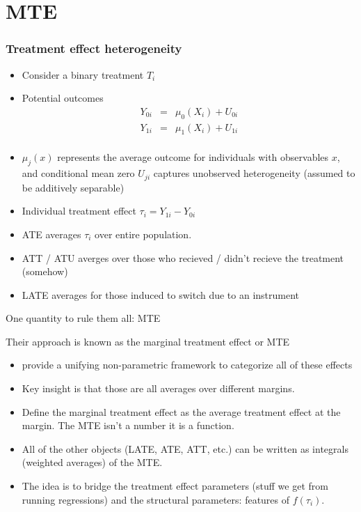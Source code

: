 \section{MTE}

\begin{frame}
  \frametitle{Treatment effect heterogeneity}
  \begin{itemize}
    \item Consider a binary treatment $T_i$
    \item Potential outcomes
      \begin{eqnarray*}
      Y_{0i} &=& \mu_{0}(X_i) + U_{0i} \\
      Y_{1i} &=& \mu_{1}(X_i) + U_{1i}\\
      \end{eqnarray*}
    \item $\mu_j(x)$ represents the average outcome for individuals with observables $x$, and conditional mean zero $U_{ji}$ captures unobserved heterogeneity (assumed to be additively separable)
    \item Individual treatment effect $\tau_i = Y_{1i} - Y_{0i}$ 
    \item ATE averages $\tau_i$ over entire population.
    \item ATT / ATU averges over those who recieved / didn't recieve the treatment (somehow)
    \item LATE averages for those induced to switch due to an instrument 
  \end{itemize}
\end{frame}

\begin{frame}{One quantity to rule them all: MTE}

 Their approach is known as the \alert{marginal treatment effect} or MTE
\begin{itemize}
\item \citet{heckman2005structural} provide a unifying non-parametric framework to categorize all of these effects
\item Key insight is that those are all averages over different margins. 
\item Define the \alert{marginal treatment effect} as the average treatment effect at the margin. The MTE isn't a number it is a \alert{function}.
\item All of the other objects (LATE, ATE, ATT, etc.) can be written as integrals (weighted averages) of the MTE.
\item The idea is to bridge the treatment effect parameters (stuff we get from running regressions) and the structural parameters: features of $f(\tau_i)$.
\end{itemize}
\end{frame}

